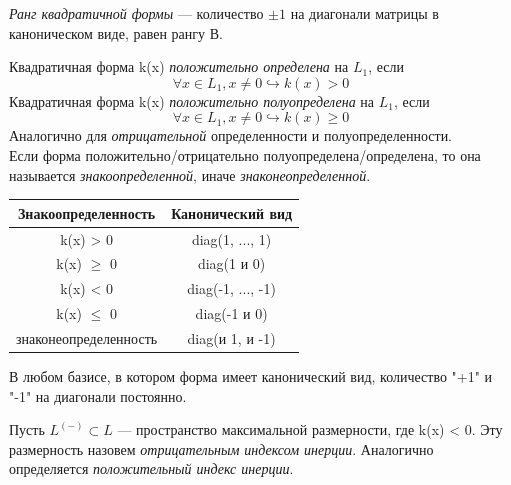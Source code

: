 \begin{definition}
    \textit{Ранг квадратичной формы} --- количество $\pm 1$ на диагонали матрицы в каноническом виде, равен рангу В.
\end{definition}

\begin{definition}
    Квадратичная форма k(x) \textit{положительно определена} на $L_1$, если
    \[
    \forall x \in L_1, x \neq 0 \hookrightarrow k(x) > 0
    \]
    Квадратичная форма k(x) \textit{положительно полуопределена} на $L_1$, если
    \[
    \forall x \in L_1, x \neq 0 \hookrightarrow k(x) \geq 0
    \]
    Аналогично для \textit{отрицательной} определенности и полуопределенности.\\
    Если форма положительно/отрицательно полуопределена/определена, то она называется \textit{знакоопределенной}, иначе \textit{знаконеопределенной}.
\end{definition}


\begin{table}[h]
    \centering
    \begin{tabular}{|c|c|}
        \hline
        Знакоопределенность & Канонический вид\\
         \hline
        k(x) > 0 & diag(1, ..., 1)\\
         \hline
        k(x) $\geq$ 0 & diag(1 и 0)\\
         \hline
        k(x) < 0 & diag(-1, ..., -1)\\
         \hline
        k(x) $\leq$ 0 & diag(-1 и 0)\\
         \hline
        знаконеопределенность & diag(и 1, и -1)\\
         \hline
    \end{tabular}
\end{table}

\begin{theorem}
    В любом базисе, в котором форма имеет канонический вид, количество "+1" и "-1" на диагонали постоянно.
\end{theorem}

\begin{definition}
    Пусть $L^{(-)} \subset L$ --- пространство максимальной размерности, где k(x) < 0. Эту размерность назовем \textit{отрицательным индексом инерции}. Аналогично определяется \textit{положительный индекс инерции}.
\end{definition}

